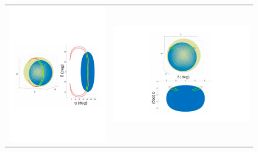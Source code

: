 \documentclass[]{spie}  %
\begin{document}
\begin{figure}
\begin{center}
\begin{tabular}{cc}
\includegraphics[scale=0.4,angle=0.0]{fig_loc_30deg} &
\includegraphics[scale=0.4,angle=90.0]{fig_loc_70deg}\\

\end{tabular}
\end{center}
\end{figure}
\end{document}
